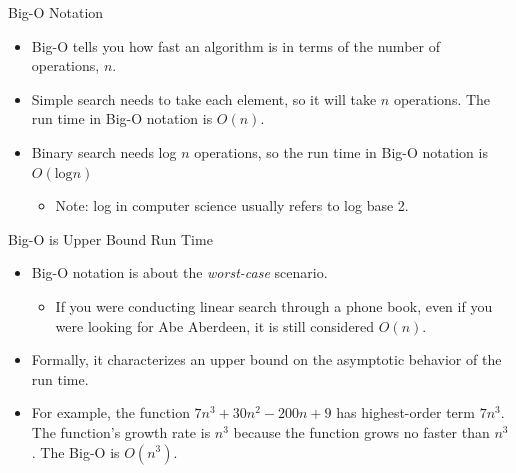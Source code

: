 \documentclass[
  ignorenonframetext,
]{beamer}
\providecommand{\tightlist}{%
  \setlength{\itemsep}{0pt}\setlength{\parskip}{0pt}}\usepackage{longtable,booktabs,array}
\begin{document}
\begin{frame}{Big-O Notation}
\protect\hypertarget{big-o-notation}{}
\begin{itemize}
\item
  Big-O tells you how fast an algorithm is in terms of the number of
  operations, \(n\).
\item
  Simple search needs to take each element, so it will take \(n\)
  operations. The run time in Big-O notation is \(O(n)\).
\item
  Binary search needs log \(n\) operations, so the run time in Big-O
  notation is \(O(\text{log}n)\)

  \begin{itemize}
  \tightlist
  \item
    Note: log in computer science usually refers to log base 2.
  \end{itemize}
\end{itemize}
\end{frame}

\begin{frame}{Big-O is Upper Bound Run Time}
\protect\hypertarget{big-o-is-upper-bound-run-time}{}
\begin{itemize}
\item
  Big-O notation is about the \emph{worst-case} scenario.

  \begin{itemize}
  \tightlist
  \item
    If you were conducting linear search through a phone book, even if
    you were looking for Abe Aberdeen, it is still considered \(O(n)\).
  \end{itemize}
\item
  Formally, it characterizes an upper bound on the asymptotic behavior
  of the run time.
\item
  For example, the function \(7n^3 + 30n^2 - 200n + 9\) has
  highest-order term \(7n^3\). The function's growth rate is \(n^3\)
  because the function grows no faster than \(n^3\). The Big-O is
  \(O(n^3)\).
\end{itemize}
\end{frame}
\end{document}
